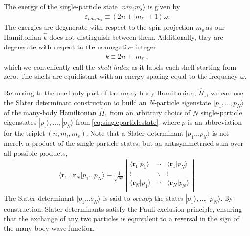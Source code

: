 The energy of the single-particle state $|n m_\ell m_{\mathrm{s}}\rangle$ is given by
\begin{align} \label{eq:energysingleparticlestate}
  \varepsilon_{n m_\ell m_{\mathrm{s}}} \equiv (2 n + |m_\ell| + 1) \omega.
\end{align}
The energies are degenerate with respect to the spin projection $m_{\mathrm{s}}$ as our Hamiltonian $\hat{h}$ does not distinguish between them.  Additionally, they are degenerate with respect to the nonnegative integer
\begin{align} \label{eq:shell_index}
  k \equiv 2 n + |m_\ell|,
\end{align}
which we conveniently call the \textit{shell index} as it labels each shell starting from zero.  The shells are equidistant with an energy spacing equal to the frequency $\omega$.

Returning to the one-body part of the many-body Hamiltonian, $\hat{H}_1$, we can use the Slater determinant construction to build an $N$-particle eigenstate $|p_1, \ldots, p_N\rangle$ of the many-body Hamiltonian $\hat{H}_1$ from an arbitrary choice of $N$ single-particle eigenstates $|p_1\rangle, \ldots, |p_N\rangle$ from \eqref{eq:singleparticlestate}, where $p$ is an abbreviation for the triplet $(n, m_\ell, m_{\mathrm{s}})$.  Note that a Slater determinant $|p_1 \ldots p_N\rangle$ is not merely a product of the single-particle states, but an antisymmetrized sum over all possible products,
\begin{align*}
  \langle \bm{r}_1 \ldots \bm{r}_N | p_1 \ldots p_N \rangle \equiv
  \frac{1}{\sqrt{N!}} \left|
  \begin{matrix}
    \langle \bm{r}_1 | p_1 \rangle & \cdots & \langle \bm{r}_1 | p_N \rangle \\
    \vdots & \ddots & \vdots \\
    \langle \bm{r}_N | p_1 \rangle & \cdots & \langle \bm{r}_N | p_N \rangle \\
  \end{matrix}
  \right|.
\end{align*}
The Slater determinant $|p_1 \ldots p_N\rangle$ is said to \textit{occupy} the states $|p_1\rangle, \ldots, |p_N\rangle$.  By construction, Slater determinants satisfy the Pauli exclusion principle, ensuring that the exchange of any two particles is equivalent to a reversal in the sign of the many-body wave function.

